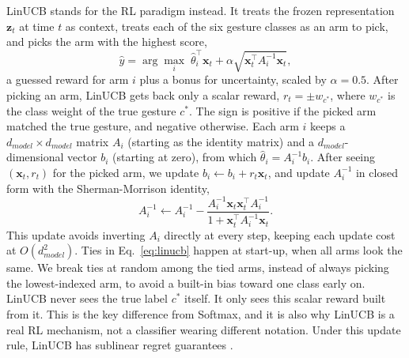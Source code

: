 \documentclass[journal]{IEEEtran}
\begin{document}
LinUCB \cite{Li2010LinUCB} stands for the RL paradigm instead. It treats the frozen representation $\mathbf{z}_t$ at time $t$ as context, treats each of the six gesture classes as an arm to pick, and picks the arm with the highest score,
\begin{equation}
\hat y=\arg\max_i \; \hat\theta_i^\top \mathbf{x}_t+\alpha\sqrt{\mathbf{x}_t^\top A_i^{-1}\mathbf{x}_t},
\label{eq:linucb}
\end{equation}
a guessed reward for arm $i$ plus a bonus for uncertainty, scaled by $\alpha=0.5$. After picking an arm, LinUCB gets back only a scalar reward, $r_t=\pm w_{c^*}$, where $w_{c^*}$ is the class weight of the true gesture $c^*$. The sign is positive if the picked arm matched the true gesture, and negative otherwise. Each arm $i$ keeps a $d_{model}\times d_{model}$ matrix $A_i$ (starting as the identity matrix) and a $d_{model}$-dimensional vector $b_i$ (starting at zero), from which $\hat\theta_i=A_i^{-1}b_i$. After seeing $(\mathbf{x}_t,r_t)$ for the picked arm, we update $b_i \leftarrow b_i + r_t\mathbf{x}_t$, and update $A_i^{-1}$ in closed form with the Sherman-Morrison identity,
\begin{equation}
A_i^{-1} \leftarrow A_i^{-1} - \frac{A_i^{-1}\mathbf{x}_t\mathbf{x}_t^\top A_i^{-1}}{1+\mathbf{x}_t^\top A_i^{-1}\mathbf{x}_t}.
\label{eq:sherman-morrison}
\end{equation}
This update avoids inverting $A_i$ directly at every step, keeping each update cost at $O(d_{model}^2)$. Ties in Eq.~\eqref{eq:linucb} happen at start-up, when all arms look the same. We break ties at random among the tied arms, instead of always picking the lowest-indexed arm, to avoid a built-in bias toward one class early on. LinUCB never sees the true label $c^*$ itself. It only sees this scalar reward built from it. This is the key difference from Softmax, and it is also why LinUCB is a real RL mechanism, not a classifier wearing different notation. Under this update rule, LinUCB has sublinear regret guarantees \cite{Chu2011Regret}.
\end{document}
